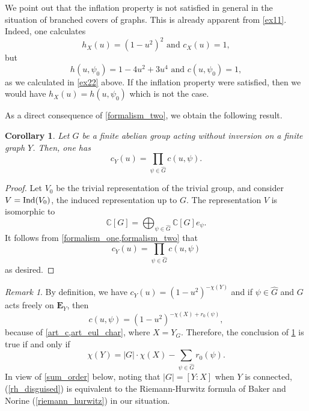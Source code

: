 \documentclass[11pt]{amsart}
\newtheorem{corollary}[theorem]{Corollary}
\numberwithin{equation}{section}
\theoremstyle{remark}
\newtheorem{remark}[theorem]{Remark}
\theoremstyle{definition}
\begin{document}
We point out that the inflation property is not satisfied in general in the situation of branched covers of graphs.  This is already apparent from \cref{ex11}.  Indeed, one calculates
$$h_{X}(u) =  (1-u^{2})^{2} \text{ and } c_{X}(u) = 1,$$
but
$$h(u,\psi_{0}) = 1-4u^{2} + 3u^{4} \text{ and } c(u,\psi_{0}) = 1, $$
as we calculated in \cref{ex22} above.  If the inflation property were satisfied, then we would have $h_{X}(u) = h(u,\psi_{0})$ which is not the case.

As a direct consequence of \cref{formalism_two}, we obtain the following result.
\begin{corollary} \label{product_form_for_c}
Let $G$ be a finite abelian group acting without inversion on a finite graph $Y$.  Then, one has
$$c_{Y}(u) = \prod_{\psi \in \widehat{G}}c(u,\psi). $$
\end{corollary}
\begin{proof}
Let $V_{0}$ be the trivial representation of the trivial group, and consider $V = {\rm Ind}(V_{0})$, the induced representation up to $G$.  The representation $V$ is isomorphic to 
$$\mathbb{C}[G] = \bigoplus_{\psi \in \widehat{G}} \mathbb{C}[G] e_{\psi}. $$
It follows from \cref{formalism_one,formalism_two} that
$$c_{Y}(u) = \prod_{\psi \in \widehat{G}} c(u,\psi)$$
as desired.
\end{proof}

\begin{remark}
By definition, we have $c_{Y}(u) = (1-u^{2})^{-\chi(Y)}$ and if $\psi \in \widehat{G}$ and $G$ acts freely on $\mathbf{E}_{Y}$, then 
$$c(u,\psi) = (1-u^{2})^{-\chi(X) + r_{0}(\psi)},$$ 
because of \cref{art_c,art_eul_char}, where $X = Y_{G}$.  Therefore, the conclusion of \cref{product_form_for_c} is true if and only if
\begin{equation} \label{rh_disguised}
\chi(Y) = |G| \cdot \chi(X) - \sum_{\psi \in \widehat{G}}r_{0}(\psi). 
\end{equation}
In view of \cref{sum_order} below, noting that $|G| = [Y:X]$ when $Y$ is connected, (\ref{rh_disguised}) is equivalent to the Riemann-Hurwitz formula of Baker and Norine (\cref{riemann_hurwitz}) in our situation.
\end{remark}
\end{document}
